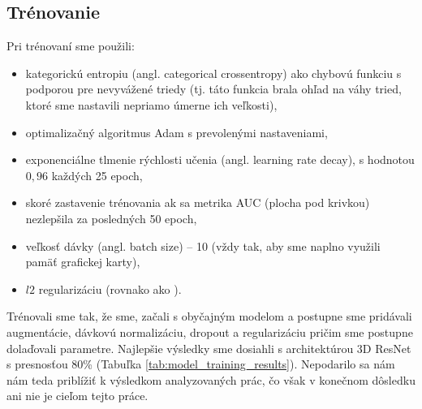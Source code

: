 \subsection{Trénovanie}

Pri trénovaní sme použili:

\begin{itemize}
    \item kategorickú entropiu (angl. categorical crossentropy) ako chybovú funkciu s podporou pre nevyvážené triedy (tj. táto funkcia brala ohľad na váhy tried, ktoré sme nastavili nepriamo úmerne ich veľkosti),
    \item optimalizačný algoritmus Adam s prevolenými nastaveniami,
    \item exponenciálne tlmenie rýchlosti učenia (angl. learning rate decay), s hodnotou $0,96$ každých 25 epoch,
    \item skoré zastavenie trénovania ak sa metrika AUC (plocha pod krivkou) nezlepšila za posledných 50 epoch,
    \item veľkosť dávky (angl. batch size) -- 10 (vždy tak, aby sme naplno využili pamäť grafickej karty),
    \item $l2$ regularizáciu (rovnako ako \citeauthor*{esmaeilzadeh2018end}).
\end{itemize}

Trénovali sme tak, že sme, začali s obyčajným modelom a postupne sme pridávali augmentácie, dávkovú normalizáciu, dropout a regularizáciu pričim sme postupne dolaďovali parametre. Najlepšie výsledky sme dosiahli s architektúrou 3D ResNet s presnosťou 80\% (Tabuľka \ref{tab:model_training_results}). Nepodarilo sa nám nám teda priblížiť k výsledkom analyzovaných prác, čo však v konečnom dôsledku ani nie je cieľom tejto práce.

